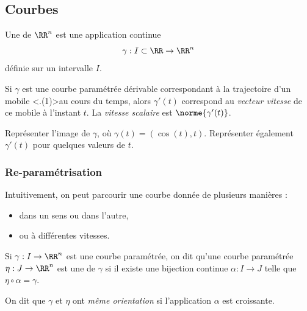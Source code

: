 \subsection{Courbes}
\begin{frame}
  \begin{definition}
    Une  de \(\RR^{n}\)\pause{} est une application continue
    \begin{equation*}
      \gamma : I \subset \RR \to \RR^{n}
    \end{equation*}
    définie sur un intervalle \(I\).
  \end{definition}\pause{}

  \begin{remark*}
    Si \(\gamma\) est une courbe paramétrée dérivable correspondant à la trajectoire d'un mobile \alert<.(1)>{au cours du temps}\pause{}, alors \(\gamma'(t)\) correspond au \emph{vecteur vitesse} de ce mobile à l'instant \(t\).\pause{} La \emph{vitesse scalaire} est \(\norme{\gamma'(t)}\).
  \end{remark*}
  \begin{exercise}\pause{}
      Représenter l'image de \(\gamma\), où \(\gamma(t) = (\cos(t), t)\). Représenter également \(\gamma'(t)\) pour quelques valeurs de \(t\). 
  \end{exercise}
\end{frame}

\subsubsection{Re-paramétrisation}
\label{sec:courbes}
\begin{frame}
  \begin{remark*}
    Intuitivement, on peut parcourir une courbe donnée de plusieurs manières :
    \begin{itemize}
    \item dans un sens ou dans l'autre,
    \item ou à différentes vitesses.
    \end{itemize}
  \end{remark*}\pause{}
  \begin{definition}
    Si \(\gamma : I \to \RR^{n}\) est une courbe paramétrée, on dit qu'une courbe paramétrée \(\eta : J \to \RR^{n}\) est une  de \(\gamma\) si\pause{} il existe une bijection continue \(\alpha : I \to J\) telle que \(\eta \circ\alpha = \gamma\).\pause{}

    On dit que \(\gamma\) et \(\eta\) ont \emph{même orientation} si l'application \(\alpha\) est croissante.
  \end{definition}
\end{frame}

